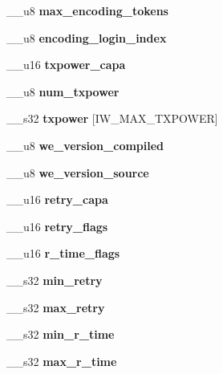 \begin{DoxyCompactItemize}
\item 
\-\_\-\-\_\-u8 {\bfseries max\-\_\-encoding\-\_\-tokens}\label{structiw__range_a3f5883abffae3d233de409ec1230abbe}

\item 
\-\_\-\-\_\-u8 {\bfseries encoding\-\_\-login\-\_\-index}\label{structiw__range_ad79e83bb40979ca3152b9d0f0e7df030}

\item 
\-\_\-\-\_\-u16 {\bfseries txpower\-\_\-capa}\label{structiw__range_aec8b0f0ce5f524b31cca5c7114b37003}

\item 
\-\_\-\-\_\-u8 {\bfseries num\-\_\-txpower}\label{structiw__range_a4a67247553e2b3e8c64bf9667fdbe80d}

\item 
\-\_\-\-\_\-s32 {\bfseries txpower} [\-I\-W\-\_\-\-M\-A\-X\-\_\-\-T\-X\-P\-O\-W\-E\-R]\label{structiw__range_a4b1c44bd40b14a7e63b0de0cf995f9e7}

\item 
\-\_\-\-\_\-u8 {\bfseries we\-\_\-version\-\_\-compiled}\label{structiw__range_aa2db19174e46a6c06dc7d76b7fe0170f}

\item 
\-\_\-\-\_\-u8 {\bfseries we\-\_\-version\-\_\-source}\label{structiw__range_ad7317c93cf02456516762702107371fe}

\item 
\-\_\-\-\_\-u16 {\bfseries retry\-\_\-capa}\label{structiw__range_af853e74eea74bafc77cea0f974842060}

\item 
\-\_\-\-\_\-u16 {\bfseries retry\-\_\-flags}\label{structiw__range_a148d88638008ce91775f378664c8f0e5}

\item 
\-\_\-\-\_\-u16 {\bfseries r\-\_\-time\-\_\-flags}\label{structiw__range_ae0bdb3b9f65c4d89469969e9a3425676}

\item 
\-\_\-\-\_\-s32 {\bfseries min\-\_\-retry}\label{structiw__range_a8ed8d1cc6e5882b7e06ea611f7933160}

\item 
\-\_\-\-\_\-s32 {\bfseries max\-\_\-retry}\label{structiw__range_af5079f65cbbebb3adc506dd6eeb9457a}

\item 
\-\_\-\-\_\-s32 {\bfseries min\-\_\-r\-\_\-time}\label{structiw__range_a2fd30db6e937aac54aa3010757772773}

\item 
\-\_\-\-\_\-s32 {\bfseries max\-\_\-r\-\_\-time}\label{structiw__range_a2fc799ceb0e86e5cf558df1c795a387c}


\end{DoxyCompactItemize}

